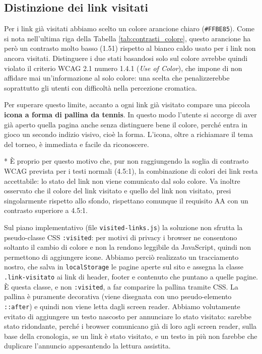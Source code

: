 \documentclass[11pt,a4paper]{article}
\begin{document}
\subsection{Distinzione dei link visitati}
Per i link già visitati abbiamo scelto un colore arancione chiaro (\texttt{\#FFBE85}). Come si nota nell'ultima riga della Tabella \ref{tab:contrasti_colore}, questo arancione ha però un contrasto molto basso (1.51) rispetto al bianco caldo usato per i link non ancora visitati. Distinguere i due stati basandosi solo sul colore avrebbe quindi violato il criterio WCAG 2.1 numero 1.4.1 (\textit{Use of Color}), che impone di non affidare mai un'informazione al solo colore: una scelta che penalizzerebbe soprattutto gli utenti con difficoltà nella percezione cromatica.

Per superare questo limite, accanto a ogni link già visitato compare una piccola \textbf{icona a forma di pallina da tennis}. In questo modo l'utente si accorge di aver già aperto quella pagina anche senza distinguere bene il colore, perché entra in gioco un secondo indizio visivo, cioè la forma. L'icona, oltre a richiamare il tema del torneo, è immediata e facile da riconoscere.

* È proprio per questo motivo che, pur non raggiungendo la soglia di contrasto WCAG prevista per i testi normali (4.5:1), la combinazione di colori dei link resta accettabile: lo stato del link non viene comunicato dal solo colore. Va inoltre osservato che il colore del link visitato e quello del link non visitato, presi singolarmente rispetto allo sfondo, rispettano comunque il requisito AA con un contrasto superiore a 4.5:1.

Sul piano implementativo (file \texttt{visited-links.js}) la soluzione non sfrutta la pseudo-classe CSS \texttt{:visited}: per motivi di privacy i browser ne consentono soltanto il cambio di colore e non la rendono leggibile da JavaScript, quindi non permettono di aggiungere icone. Abbiamo perciò realizzato un tracciamento nostro, che salva in \texttt{localStorage} le pagine aperte sul sito e assegna la classe \texttt{.link-visitato} ai link di header, footer e contenuto che puntano a quelle pagine. È questa classe, e non \texttt{:visited}, a far comparire la pallina tramite CSS. La pallina è puramente decorativa (viene disegnata con uno pseudo-elemento \texttt{::after}) e quindi non viene letta dagli screen reader. Abbiamo volutamente evitato di aggiungere un testo nascosto per annunciare lo stato visitato: sarebbe stato ridondante, perché i browser comunicano già di loro agli screen reader, sulla base della cronologia, se un link è stato visitato, e un testo in più non farebbe che duplicare l'annuncio appesantendo la lettura assistita.\\
\end{document}
